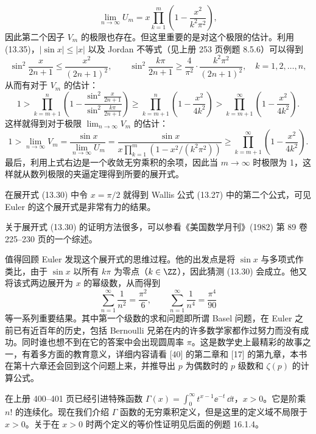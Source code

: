 \begin{xproof}
\begin{equation}
\lim_{n\to\infty}U_m=x\prod_{k=1}^{m}\left(1-\frac{x^2}{k^2\pi^2}\right),
\tag{13.36}
\end{equation}
因此第二个因子 $V_m$ 的极限也存在。但这里重要的是对这个极限的估计。利用 (13.35)，$|\sin x|\leq|x|$ 以及 Jordan 不等式（见上册 253 页例题 8.5.6）可以得到
\[
\sin^2\frac{x}{2n+1}\leq\frac{x^2}{(2n+1)^2},
\qquad
\sin^2\frac{k\pi}{2n+1}\geq\frac4{\pi^2}\cdot\frac{k^2\pi^2}{(2n+1)^2},\quad k=1,2,\ldots,n,
\]
从而有对于 $V_m$ 的估计：
\[
1>\prod_{k=m+1}^{n}\left(1-\frac{\sin^2\frac{x}{2n+1}}{\sin^2\frac{k\pi}{2n+1}}\right)
\geq\prod_{k=m+1}^{n}\left(1-\frac{x^2}{4k^2}\right)
>\prod_{k=m+1}^{\infty}\left(1-\frac{x^2}{4k^2}\right).
\]
这样就得到对于极限 $\lim_{n\to\infty}V_m$ 的估计：
\[
1>\lim_{n\to\infty}V_m=\frac{\sin x}{\lim_{n\to\infty}U_m}
=\frac{\sin x}{x\prod_{k=1}^{m}(1-x^2/(k^2\pi^2))}
\geq\prod_{k=m+1}^{\infty}\left(1-\frac{x^2}{4k^2}\right).
\]
最后，利用上式右边是一个收敛无穷乘积的余项，因此当 $m\to\infty$ 时极限为 1，这样就从数列极限的夹逼定理得到所要的展开式。
\end{xproof}

\begin{xremark}
在展开式 (13.30) 中令 $x=\pi/2$ 就得到 Wallis 公式 (13.27) 中的第二个公式，可见 Euler 的这个展开式是非常有力的结果。
\end{xremark}

\begin{xremark}
关于展开式 (13.30) 的证明方法很多，可以参看《美国数学月刊》(1982) 第 89 卷 225--230 页的一个综述。
\end{xremark}

\begin{xremark}
值得回顾 Euler 发现这个展开式的思维过程。他的出发点是将 $\sin x$ 与多项式作类比，由于 $\sin x$ 以所有 $k\pi$ 为零点（$k\in\ZZ$），因此猜测 (13.30) 会成立。他又将该式两边展开为 $x$ 的幂级数，从而得到
\[
\sum_{n=1}^{\infty}\frac1{n^2}=\frac{\pi^2}{6},\qquad
\sum_{n=1}^{\infty}\frac1{n^4}=\frac{\pi^4}{90}
\]
等一系列重要结果。其中第一个级数的求和问题即所谓 Basel 问题，在 Euler 之前已有近百年的历史，包括 Bernoulli 兄弟在内的许多数学家都作过努力而没有成功。同时谁也想不到在它的答案中会出现圆周率 $\pi$。这是数学史上最精彩的故事之一，有着多方面的教育意义，详细内容请看 [40] 的第二章和 [17] 的第九章，本书在第十六章还会回到这个问题上来，并推导出 $p$ 为偶数时的 $p$ 级数和 $\zeta(p)$ 的计算公式。
\end{xremark}

在上册 400--401 页已经引进特殊函数 $\Gamma(x)=\int_0^{\infty}t^{x-1}\ee^{-t}\,\dd t$，$x>0$。它是阶乘 $n!$ 的连续化。现在我们介绍 $\Gamma$ 函数的无穷乘积定义，但是这里的定义域不局限于 $x>0$。关于在 $x>0$ 时两个定义的等价性证明见后面的例题 16.1.4。


